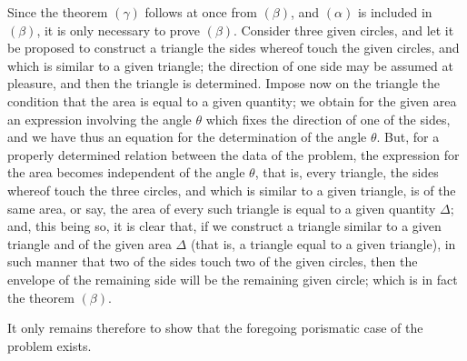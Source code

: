 \documentclass[11pt,a4paper]{article}
\begin{document}
Since the theorem $(\gamma)$ follows at once from $(\beta)$, and $(\alpha)$ is included in $(\beta)$,
it is only necessary to prove $(\beta)$. Consider three given circles, and let it be proposed
to construct a triangle the sides whereof touch the given circles, and which is similar
to a given triangle; the direction of one side may be assumed at pleasure, and then
the triangle is determined. Impose now on the triangle the condition that the area
is equal to a given quantity; we obtain for the given area an expression involving
the angle $\theta$ which fixes the direction of one of the sides, and we have thus an
equation for the determination of the angle $\theta$. But, for a properly determined
relation between the data of the problem, the expression for the area becomes
independent of the angle $\theta$, that is, every triangle, the sides whereof touch the three
circles, and which is similar to a given triangle, is of the same area, or say, the area
of every such triangle is equal to a given quantity $\Delta$; and, this being so, it is
clear that, if we construct a triangle similar to a given triangle and of the given
area $\Delta$ (that is, a triangle equal to a given triangle), in such manner that two of
the sides touch two of the given circles, then the envelope of the remaining side will
be the remaining given circle; which is in fact the theorem $(\beta)$.

It only remains therefore to show that the foregoing porismatic case of the problem
exists.
\end{document}
